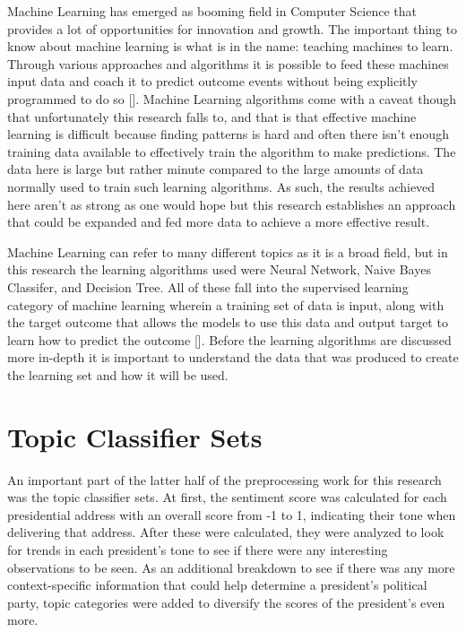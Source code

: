 Machine Learning has emerged as booming field in Computer Science that provides a lot of opportunities for innovation and growth.
The important thing to know about machine learning is what is in the name: teaching machines to learn.
Through various approaches and algorithms it is possible to feed these machines input data and coach it to predict outcome events without being explicitly programmed to do so [\cite{hansen1990neural}].
Machine Learning algorithms come with a caveat though that unfortunately this research falls to, and that is that effective machine learning is difficult because finding patterns is hard and often there isn't enough training data available to effectively train the algorithm to make predictions.
The data here is large but rather minute compared to the large amounts of data normally used to train such learning algorithms.
As such, the results achieved here aren't as strong as one would hope but this research establishes an approach that could be expanded and fed more data to achieve a more effective result.

Machine Learning can refer to many different topics as it is a broad field, but in this research the learning algorithms used were Neural Network, Naive Bayes Classifer, and Decision Tree.
All of these fall into the supervised learning category of machine learning wherein a training set of data is input, along with the target outcome that allows the models to use this data and output target to learn how to predict the outcome [\cite{dietterich1998approximate}].
Before the learning algorithms are discussed more in-depth it is important to understand the data that was produced to create the learning set and how it will be used.

\section{Topic Classifier Sets}
An important part of the latter half of the preprocessing work for this research was the topic classifier sets.
At first, the sentiment score was calculated for each presidential address with an overall score from -1 to 1, indicating their tone when delivering that address.
After these were calculated, they were analyzed to look for trends in each president's tone to see if there were any interesting observations to be seen.
As an additional breakdown to see if there was any more context-specific information that could help determine a president's political party, topic categories were added to diversify the scores of the president's even more.

